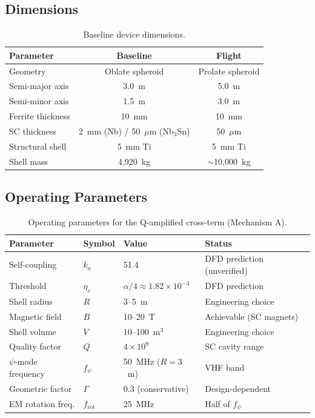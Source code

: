 \documentclass[12pt,aps,prd,superscriptaddress,nofootinbib,longbibliography]{revtex4-2}
\newcommand{\ka}{k_a}
\newcommand{\etac}{\eta_c}
\begin{document}
\subsection{Dimensions}

\begin{table}[h]
\caption{Baseline device dimensions.}
\begin{ruledtabular}
\begin{tabular}{lcc}
Parameter & Baseline & Flight \\
\hline
Geometry & Oblate spheroid & Prolate spheroid \\
Semi-major axis & 3.0~m & 5.0~m \\
Semi-minor axis & 1.5~m & 3.0~m \\
Ferrite thickness & 10~mm & 10~mm \\
SC thickness & 2~mm (Nb) / 50~$\mu$m (Nb$_3$Sn) & 50~$\mu$m \\
Structural shell & 5~mm Ti & 5~mm Ti \\
Shell mass & 4,920~kg & $\sim$10,000~kg \\
\end{tabular}
\end{ruledtabular}
\end{table}

\subsection{Operating Parameters}

\begin{table}[h]
\caption{Operating parameters for the Q-amplified cross-term (Mechanism A).}
\begin{ruledtabular}
\begin{tabular}{llll}
Parameter & Symbol & Value & Status \\
\hline
Self-coupling & $\ka$ & 51.4 & DFD prediction (unverified) \\
Threshold & $\etac$ & $\alpha/4 \approx 1.82 \times 10^{-3}$ & DFD prediction \\
Shell radius & $R$ & 3--5~m & Engineering choice \\
Magnetic field & $B$ & 10--20~T & Achievable (SC magnets) \\
Shell volume & $V$ & 10--100~m$^3$ & Engineering choice \\
Quality factor & $Q$ & $4 \times 10^9$ & SC cavity range \\
$\psi$-mode frequency & $f_\psi$ & 50~MHz ($R = 3$~m) & VHF band \\
Geometric factor & $\Gamma$ & 0.3 (conservative) & Design-dependent \\
EM rotation freq. & $f_{\mathrm{rot}}$ & 25~MHz & Half of $f_\psi$ \\
\end{tabular}
\end{ruledtabular}
\end{table}
\end{document}
